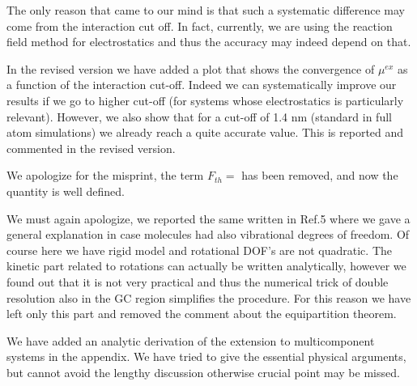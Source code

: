 \documentclass[12pt]{article}
\begin{document}
The only reason that came to our mind is that such a systematic difference may come from the interaction cut off.
In fact, currently, we are using the reaction field method for electrostatics and thus the accuracy may indeed depend on that.

In the revised version we have added a plot that shows the convergence
of $\mu^{ex}$ as a function of the interaction cut-off.  Indeed we can
systematically improve our results if we go to higher cut-off (for
systems whose electrostatics is particularly relevant).  However, we
also show that for a cut-off of 1.4 nm (standard in full atom
simulations) we already reach a quite accurate value.  This is
reported and commented in the revised version.


{
}

We apologize for the misprint, the term $F_{th}=$ has been removed, and now the quantity is well defined.


{\color{blue}{\it On page 5, the authors indicate that equipartition
    implies a contribution to the chemical potential of 1/2 kT for
    each atomic degree of freedom (dof). I would expect that this
    would be true if each atomic dof contributes quadratically to the
    Hamiltonian. It would be helpful if the authors could clarify why
    this would be so for dof's that do not contribute quadratically to
    the Hamiltonian.}}

We must again apologize, we reported the same written in Ref.5 where
we gave a general explanation in case molecules had also vibrational
degrees of freedom. Of course here we have rigid model and rotational
DOF's are not quadratic. The kinetic part related to rotations can
actually be written analytically, however we found out that it is not
very practical and thus the numerical trick of double resolution also
in the GC region simplifies the procedure.  For this reason we have
left only this part and removed the comment about the equipartition
theorem.

{\color{blue}{\it  It would be helpful if the authors could clarify why/how eq 3 generalizes to eq 4 in the case of a multicomponent system}}

We have added an analytic derivation of the extension to
multicomponent systems in the appendix.  We have tried to give the
essential physical arguments, but cannot avoid the lengthy discussion
otherwise crucial point may be missed.

 
\end{document}
